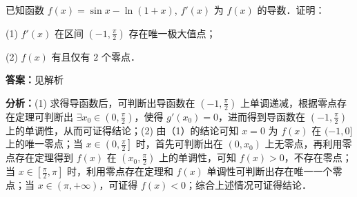 \begin{question}[points=12]
已知函数 $f(x) = \sin x - \ln(1 + x)$, $f'(x)$ 为 $f(x)$ 的导数．证明：

(1) $f'(x)$ 在区间 $\left(-1, \frac{\pi}{2}\right)$ 存在唯一极大值点；

(2) $f(x)$ 有且仅有 $2$ 个零点．
\begin{solution}
\textbf{答案：}见解析

\textbf{分析：}(1) 求得导函数后，可判断出导函数在 $\left(-1, \frac{\pi}{2}\right)$ 上单调递减，根据零点存在定理可判断出 $\exists x_0 \in \left(0, \frac{\pi}{2}\right)$，使得 $g'(x_0) = 0$，进而得到导函数在 $\left(-1, \frac{\pi}{2}\right)$ 上的单调性，从而可证得结论；(2) 由（1）的结论可知 $x = 0$ 为 $f(x)$ 在 $(-1, 0]$ 上的唯一零点；当 $x \in \left(0, \frac{\pi}{2}\right]$ 时，首先可判断出在 $(0, x_0)$ 上无零点，再利用零点存在定理得到 $f(x)$ 在 $\left(x_0, \frac{\pi}{2}\right)$ 上的单调性，可知 $f(x) > 0$，不存在零点；当 $x \in \left[\frac{\pi}{2}, \pi\right]$ 时，利用零点存在定理和 $f(x)$ 单调性可判断出存在唯一一个零点；当 $x \in (\pi, +\infty)$，可证得 $f(x) < 0$；综合上述情况可证得结论．


\end{solution}
\end{question}
